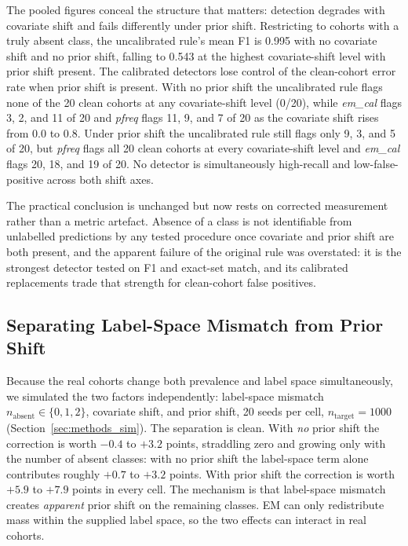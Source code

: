 \documentclass[10pt,journal,compsoc,twocolumn]{IEEEtran}
\begin{document}
The pooled figures conceal the structure that matters: detection degrades with covariate shift and fails differently under prior shift. Restricting to cohorts with a truly absent class, the uncalibrated rule's mean F1 is 0.995 with no covariate shift and no prior shift, falling to 0.543 at the highest covariate-shift level with prior shift present. The calibrated detectors lose control of the clean-cohort error rate when prior shift is present. With no prior shift the uncalibrated rule flags none of the 20 clean cohorts at any covariate-shift level (0/20), while \emph{em\_cal} flags 3, 2, and 11 of 20 and \emph{pfreq} flags 11, 9, and 7 of 20 as the covariate shift rises from 0.0 to 0.8. Under prior shift the uncalibrated rule still flags only 9, 3, and 5 of 20, but \emph{pfreq} flags all 20 clean cohorts at every covariate-shift level and \emph{em\_cal} flags 20, 18, and 19 of 20. No detector is simultaneously high-recall and low-false-positive across both shift axes.

The practical conclusion is unchanged but now rests on corrected measurement rather than a metric artefact. Absence of a class is not identifiable from unlabelled predictions by any tested procedure once covariate and prior shift are both present, and the apparent failure of the original rule was overstated: it is the strongest detector tested on F1 and exact-set match, and its calibrated replacements trade that strength for clean-cohort false positives.

\subsection{Separating Label-Space Mismatch from Prior Shift}

Because the real cohorts change both prevalence and label space simultaneously, we simulated the two factors independently: label-space mismatch $n_{\text{absent}} \in \{0,1,2\}$, covariate shift, and prior shift, 20 seeds per cell, $n_{\text{target}} = 1000$ (Section~\ref{sec:methods_sim}). The separation is clean. With \emph{no} prior shift the correction is worth $-0.4$ to $+3.2$ points, straddling zero and growing only with the number of absent classes: with no prior shift the label-space term alone contributes roughly $+0.7$ to $+3.2$ points. With prior shift the correction is worth $+5.9$ to $+7.9$ points in every cell. The mechanism is that label-space mismatch creates \emph{apparent} prior shift on the remaining classes. EM can only redistribute mass within the supplied label space, so the two effects can interact in real cohorts.
\end{document}
